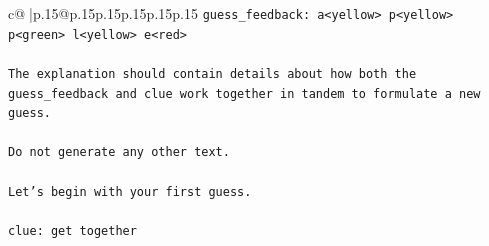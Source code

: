 \documentclass{article}
\begin{document}
{\begin{supertabular}{c@{$\;$}|p{.15\linewidth}@{}p{.15\linewidth}p{.15\linewidth}p{.15\linewidth}p{.15\linewidth}p{.15\linewidth}}
{{{\texttt{guess\_feedback: a<yellow> p<yellow> p<green> l<yellow> e<red>} \\
\\ 
\texttt{The explanation should contain details about how both the guess\_feedback and clue work together in tandem to formulate a new guess.} \\
\\ 
\texttt{Do not generate any other text.} \\
\\ 
\texttt{Let's begin with your first guess.} \\
\\ 
\texttt{clue: get together} \\
            }
        }
    }
     \\ \\


\end{supertabular}}
\end{document}
